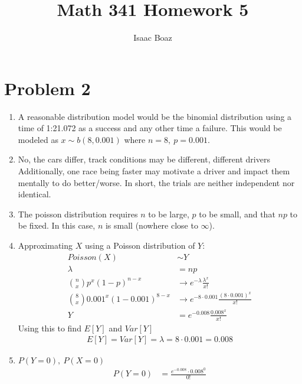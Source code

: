 \documentclass{article}
\title{\vspace{-4ex}Math 341 Homework 5}
\author{Isaac Boaz}
\begin{document}
\maketitle

\section*{Problem 2}
\begin{enumerate}[label=\alph*)]
    \item A reasonable distribution model would be the binomial distribution using a time of 1:21.072 as a success and any other time a failure. This would be modeled as \(x \sim b(8, 0.001)\) where \(n = 8,\ p = 0.001\).
    \item No, the cars differ, track conditions may be different, different drivers
          Additionally, one race being faster may motivate a driver and impact them mentally to do better/worse. In short, the trials are neither independent nor identical.
    \item The poisson distribution requires \(n\) to be large, \(p\) to be small, and that \(np\) to be fixed. In this case, \(n\) is small (nowhere close to \(\infty\)).
    \item Approximating \(X\) using a Poisson distribution of \(Y\):
          \begin{align*}
              Poisson(X)                         & \sim Y                                                 \\
              \lambda                            & = np                                                   \\
              \binom{n}{x}p^x(1-p)^{n-x}         & \rightarrow e^{-\lambda}\frac{\lambda^x}{x!}           \\
              \binom{8}{x}0.001^x(1-0.001)^{8-x} & \rightarrow e^{-8\cdot0.001}\frac{(8\cdot0.001)^x}{x!} \\
              Y                                  & = e^{-0.008} \frac{0.008^x}{x!}
          \end{align*}
          Using this to find \(E[Y]\) and \(Var[Y]\)
          \begin{align*}
              E[Y] = Var[Y] = \lambda = 8\cdot0.001 = 0.008
          \end{align*}
    \item \(P(Y = 0),\ P(X = 0)\) %
          \begin{align*}
              P(Y = 0) & = \frac{e^{-0.008} \cdot 0.008^0}{0!} \\

\end{align*}
\end{enumerate}
\end{document}
